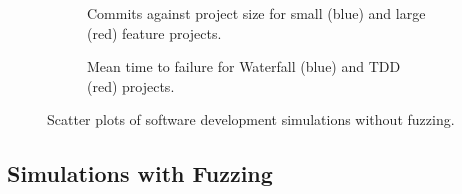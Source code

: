 \documentclass{llncs}
\begin{document}
\begin{figure}[t]
  \centering

  \begin{subfigure}{2.3in}
    \caption{Commits against project size for small (blue) and large (red) feature projects.}
    \label{fig:no-fuzzing:features}
  \end{subfigure}
  \begin{subfigure}{2.3in}
    \caption{Mean time to failure for Waterfall (blue) and TDD (red) projects.}  
    \label{fig:no-fuzzing:mtf}
  \end{subfigure}
  
  \caption{Scatter plots of software development simulations without fuzzing.}
  \label{fig:no-fuzzing}
\end{figure}


\subsection{Simulations with Fuzzing}
\end{document}
